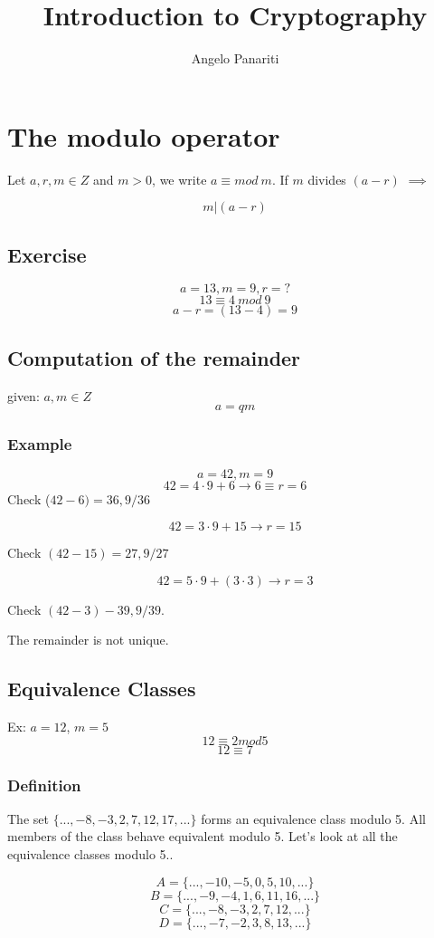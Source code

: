 \documentclass[a4paper]{article}
\title{Introduction to Cryptography}
\author{Angelo Panariti}
\begin{document}
\maketitle
\centerofcontents
\section{The modulo operator}
Let $a, r, m \in Z$ and $m > 0$, we write $a \equiv mod \ m$.
If $m$ divides $(a -r)$ $\implies$ 

$$m | (a - r)$$

\subsection{Exercise}

$$a = 13, m = 9, r=?$$
$$13 \equiv 4 \ mod \ 9$$
$$a-r = (13 - 4) = 9$$
\subsection{Computation of the remainder}

given: $a, m \in Z$
$$ a = qm $$
\subsubsection{Example}

$$ a = 42, m = 9$$
$$42 = 4 \cdot 9 + 6 \rightarrow 6 \equiv r = 6$$
Check ($42-6) = 36, 9/36$

$$42 = 3 \cdot 9 + 15 \rightarrow r = 15$$

Check $(42 - 15) = 27, 9/27$
 
$$42 = 5 \cdot 9 + ( 3 \cdot 3) \rightarrow r = 3$$

Check $(42 - 3) - 39, 9/39$. 

The remainder is not unique.
\subsection{Equivalence Classes}
Ex: $a=12$, $m=5$
$$12 \equiv 2 mod 5$$
$$12 \equiv 7$$
\subsubsection{Definition}
{The set $\{...,-8,-3, 2, 7, 12 ,17,...\}$ forms an equivalence class modulo 5. All members of the class behave equivalent modulo 5. Let's look at all the equivalence classes modulo 5.}. 

$$A = \{...,-10, -5, 0, 5, 10,...\}$$
$$B = \{..., -9, -4, 1, 6, 11, 16,...\}$$
$$C =\{...,-8,-3,2,7,12,...\}$$
$$D =\{...,-7,-2,3, 8, 13,...\}$$
\end{document}
